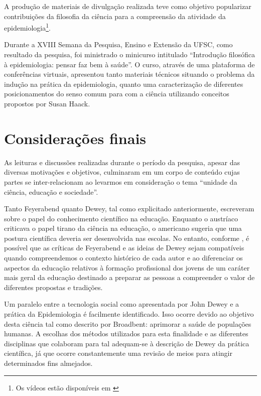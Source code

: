 \documentclass[12pt]{report}
\begin{document}
	 	A produção de materiais de divulgação realizada teve como objetivo popularizar contribuições da filosofia da ciência para a compreensão da atividade da epidemiologia\footnote{Os vídeos estão disponíveis em \textcite{youtube}}.
	 	
	 	Durante a XVIII Semana da Pesquisa, Ensino e Extensão da UFSC, como resultado da pesquisa, foi ministrado o minicurso intitulado ``Introdução filosófica à epidemiologia: pensar faz bem à saúde''.
	 	O curso, através de uma plataforma de conferências virtuais, apresentou tanto materiais técnicos situando o problema da indução na prática da epidemiologia, quanto uma caracterização de diferentes posicionamentos do senso comum para com a ciência utilizando conceitos propostos por Susan Haack.
		
	\vspace*{-0.6cm}
	\chapter*{Considerações finais}
	\vspace*{-0.75cm}
	
	As leituras e discussões realizadas durante o período da pesquisa, apesar das diversas motivações e objetivos, culminaram em um corpo de conteúdo cujas partes se inter-relacionam ao levarmos em consideração o tema ``unidade da ciência, educação e sociedade''.
	
	Tanto Feyerabend quanto Dewey, tal como explicitado anteriormente, escreveram sobre o papel do conhecimento científico na educação.
	Enquanto o austríaco criticava o papel tirano da ciência na educação, o americano sugeria que uma postura científica deveria ser desenvolvida nas escolas.
	No entanto, conforme \textcite{cunha_sci_and_edu}, é possível que as críticas de Feyerabend e as ideias de Dewey sejam compatíveis quando compreendemos o contexto histórico de cada autor e ao diferenciar os aspectos da educação relativos à formação profissional dos jovens de um caráter mais geral da educação destinado a preparar as pessoas a compreender o valor de diferentes propostas e tradições.
	
	Um paralelo entre a tecnologia social como apresentada por John Dewey e a prática da Epidemiologia é facilmente identificado.
	Isso ocorre devido ao objetivo desta ciência tal como descrito por Broadbent: aprimorar a saúde de populações humanas.
	A escolhas dos métodos utilizados para esta finalidade e as diferentes disciplinas que colaboram para tal adequam-se à descrição de Dewey da prática científica, já que ocorre constantemente uma revisão de meios para atingir determinados fins almejados.
	
\end{document}
